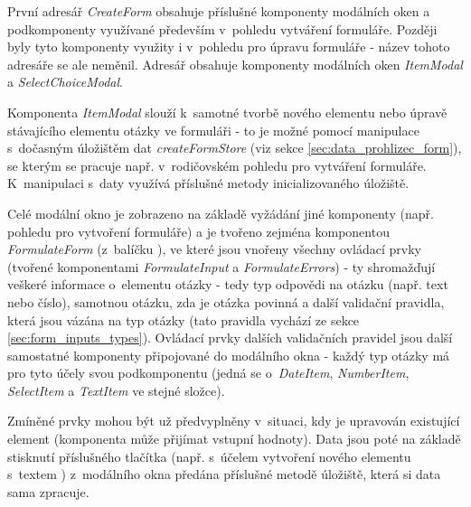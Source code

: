 			\label{sec:komp_modal_form}
			První adresář \textit{CreateForm} obsahuje příslušné komponenty modálních oken a podkomponenty využívané především v~pohledu vytváření formuláře. Později byly tyto komponenty využity i v~pohledu pro úpravu formuláře - název tohoto adresáře se ale neměnil. Adresář obsahuje komponenty modálních oken \textit{ItemModal} a \textit{SelectChoiceModal}.
			
			Komponenta \textit{ItemModal} slouží k~samotné tvorbě nového elementu nebo úpravě stávajícího elementu otázky ve formuláři - to je možné pomocí manipulace s~dočasným úložištěm dat \textit{createFormStore} (viz sekce \ref{sec:data_prohlizec_form}), se kterým se pracuje např. v~rodičovském pohledu pro vytváření formuláře. K~manipulaci s~daty využívá příslušné metody inicializovaného úložiště.
			
			Celé modální okno je zobrazeno na základě vyžádání jiné komponenty (např. pohledu pro vytvoření formuláře) a je tvořeno zejména komponentou \textit{FormulateForm} (z~balíčku ), ve které jsou vnořeny všechny ovládací prvky (tvořené komponentami \textit{FormulateInput} a \textit{FormulateErrors}) - ty shromažďují veškeré informace o~elementu otázky - tedy typ odpovědi na otázku (např. text nebo číslo), samotnou otázku, zda je otázka povinná a další validační pravidla, která jsou vázána na typ otázky (tato pravidla vychází ze sekce \ref{sec:form_inputs_types}). Ovládací prvky dalších validačních pravidel jsou další samostatné komponenty připojované do modálního okna - každý typ otázky má pro tyto účely svou podkomponentu (jedná se o~\textit{DateItem}, \textit{NumberItem}, \textit{SelectItem} a \textit{TextItem} ve stejné složce). 
			
			Zmíněné prvky mohou být už předvyplněny v~situaci, kdy je upravován existující element (komponenta může přijímat vstupní hodnoty). Data jsou poté na základě stisknutí příslušného tlačítka (např. s~účelem vytvoření nového elementu s~textem ) z~modálního okna předána příslušné metodě úložiště, která si data sama zpracuje.
			
